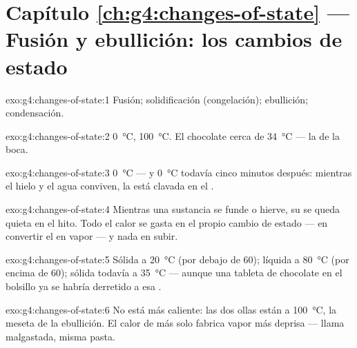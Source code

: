 \section*{Capítulo \ref{ch:g4:changes-of-state} --- Fusión y ebullición: los cambios de estado}

\begin{solution}{exo:g4:changes-of-state:1}
Fusión; solidificación (congelación); ebullición; condensación.
\end{solution}

\begin{solution}{exo:g4:changes-of-state:2}
 \qty{0}{\celsius}, 
\qty{100}{\celsius}. El chocolate  cerca de
\qty{34}{\celsius} --- la  de la boca.
\end{solution}

\begin{solution}{exo:g4:changes-of-state:3}
\qty{0}{\celsius} --- y \qty{0}{\celsius} todavía cinco minutos
después: mientras el hielo y el agua conviven, la  está
clavada en el .
\end{solution}

\begin{solution}{exo:g4:changes-of-state:4}
Mientras una sustancia se funde o hierve, su  se queda
quieta en el hito. Todo el calor se gasta en el propio cambio de
estado --- en convertir el  en vapor --- y nada en subir.
\end{solution}

\begin{solution}{exo:g4:changes-of-state:5}
Sólida a \qty{20}{\celsius} (por debajo de $60$); líquida a
\qty{80}{\celsius} (por encima de $60$); sólida todavía a
\qty{35}{\celsius} --- aunque una tableta de chocolate en el bolsillo
ya se habría derretido a esa .
\end{solution}

\begin{solution}{exo:g4:changes-of-state:6}
No está más caliente: las dos ollas están a \qty{100}{\celsius}, la
meseta de la ebullición. El calor de más solo fabrica vapor más
deprisa --- llama malgastada, misma pasta.
\end{solution}

